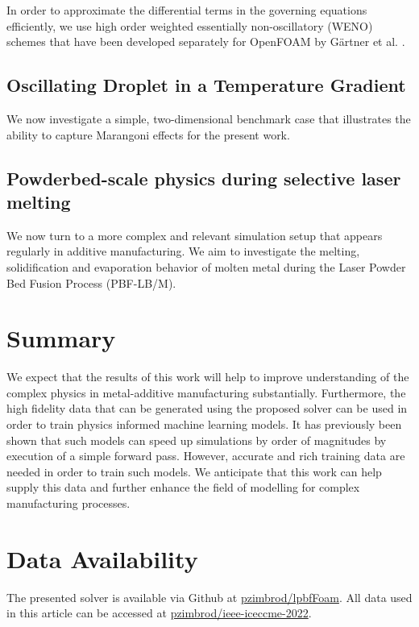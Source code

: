 \documentclass[conference,final]{IEEEtran}
\begin{document}
In order to approximate the differential terms in the governing equations efficiently, we use high order weighted essentially non-oscillatory (WENO) schemes that have been developed separately for OpenFOAM by Gärtner et al. \cite{gartnerEfficientWENOLibrary2020,martinImplementationValidationSemiImplicit2018}.

\subsection{Oscillating Droplet in a Temperature Gradient}

We now investigate a simple, two-dimensional benchmark case that illustrates the ability to capture Marangoni effects for the present work.

\subsection{Powderbed-scale physics during selective laser melting}

We now turn to a more complex and relevant simulation setup that appears regularly in additive manufacturing. We aim to investigate the melting, solidification and evaporation behavior of molten metal during the Laser Powder Bed Fusion Process (PBF-LB/M).

\section{Summary}

We expect that the results of this work will help to improve understanding of the complex physics in metal-additive manufacturing substantially. Furthermore, the high fidelity data that can be generated using the proposed solver can be used in order to train physics informed machine learning models. It has previously been shown that such models can speed up simulations by order of magnitudes by execution of a simple forward pass. However, accurate and rich training data are needed in order to train such models. We anticipate that this work can help supply this data and further enhance the field of modelling for complex manufacturing processes.

\section{Data Availability}

The presented solver is available via Github at \href{https://github.com/pzimbrod/lpbfFoam}{pzimbrod/lpbfFoam}. All data used in this article can be accessed at \href{https://github.com/pzimbrod/ieee-iceccme-2022}{pzimbrod/ieee-iceccme-2022}.



\end{document}
